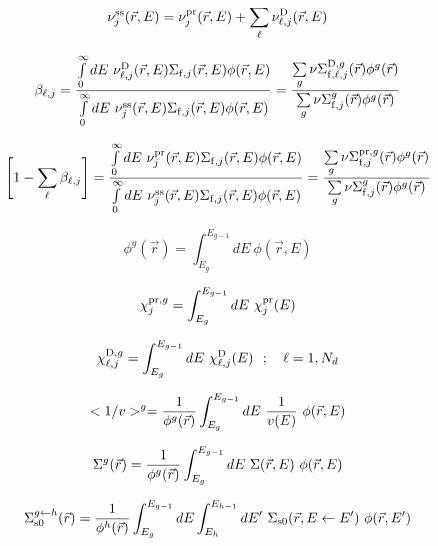 \begin{equation}
\nu_j^{\rm ss}(\vec r,E)=\nu_j^{\rm pr}(\vec r,E)+\sum_\ell \nu_{\ell,j}^{\rm D}(\vec r,E)
\end{equation}

\begin{equation}
\beta_{\ell,j}={\int\limits_0^\infty dE \ \nu_{\ell,j}^{\rm D}(\vec r,E)\Sigma_{{\rm f},j}(\vec r,E)
\phi(\vec r,E) \over \int\limits_0^\infty dE \ \nu_j^{\rm ss}(\vec r,E)\Sigma_{{\rm f},j}(\vec r,E)
\phi(\vec r,E)} = {\sum\limits_g \nu\Sigma_{{\rm f},\ell,j}^{{\rm D},g}(\vec r) \phi^g(\vec r) \over
\sum\limits_g \nu\Sigma_{{\rm f},j}^g(\vec r) \phi^g(\vec r)}
\end{equation}

\begin{equation}
\left[1-\sum_\ell\beta_{\ell,j}\right]={\int\limits_0^\infty dE \ \nu_j^{\rm pr}(\vec r,E)\Sigma_{{\rm f},j}(\vec r,E)
\phi(\vec r,E) \over \int\limits_0^\infty dE \ \nu_j^{\rm ss}(\vec r,E)\Sigma_{{\rm f},j}(\vec r,E)
\phi(\vec r,E)} = {\sum\limits_g \nu\Sigma_{{\rm f},j}^{{\rm pr},g}(\vec r)
\phi^g(\vec r) \over \sum\limits_g \nu\Sigma_{{\rm f},j}^g(\vec r) \phi^g(\vec r)}
\end{equation}

\begin{equation}
\phi^g(\vec r)=\int_{E_g}^{E_{g-1}} dE \ \phi(\vec r,E) 
\end{equation}

\begin{equation}
\chi_j^{{\rm pr},g}=\int_{E_g}^{E_{g-1}} dE \ \chi_j^{\rm pr}(E) 
\end{equation}

\begin{equation}
\chi_{\ell,j}^{{\rm D},g}=\int_{E_g}^{E_{g-1}} dE \ \chi_{\ell,j}^{\rm D}(E) \ \ ; \ \ \
\ell=1,N_d
\end{equation}

\begin{equation}
<1/v>^g={1 \over \phi^g(\vec r)} \int_{E_g}^{E_{g-1}} dE \ {\displaystyle 1 \over \displaystyle v(E)} \ \phi(\vec r,E)
\end{equation}

\begin{equation}
\Sigma^g(\vec r)={1 \over \phi^g(\vec r)} \int_{E_g}^{E_{g-1}} dE \ \Sigma(\vec r,E) \ \phi(\vec r,E)
\end{equation}

\begin{equation}
\Sigma_{\rm s0}^{g \leftarrow h}(\vec r)={1 \over \phi^h(\vec r)} \int_{E_g}^{E_{g-1}} dE \int_{E_h}^{E_{h-1}} dE' \ \Sigma_{\rm s0}(\vec r,E \leftarrow E') \ \phi(\vec r,E')
\end{equation}

